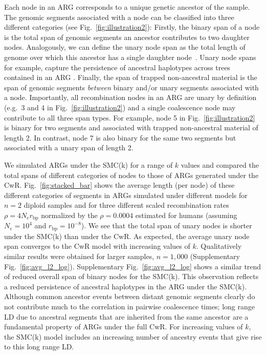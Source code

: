 \documentclass[9pt,twocolumn,twoside,lineno]{gsajnl}
\begin{document}
Each node in an ARG corresponds to a unique genetic ancestor of the sample. The genomic segments associated with a node can be classified into three different categories (see Fig.~\ref{fig:illustration2}): Firstly, the binary span of a node is the total span of genomic segments an ancestor contributes to two daughter nodes. Analogously, we can define the unary node span as the total length of genome over which this ancestor has a single daughter node~\cite{wong_general_2024}. Unary node spans  for example, capture the persistence of ancestral haplotypes across trees contained in an ARG \citep{Fritze_forest_2025}. Finally, the span of trapped non-ancestral material is the span of genomic segments \textit{between} binary and/or unary segments associated with a node. Importantly, all recombination nodes in an ARG are unary by definition (e.g.\ 3 and 4 in Fig.~\ref{fig:illustration2}) and a single coalescence node may contribute to all three span types. For example, node 5 in Fig.~\ref{fig:illustration2} is binary for two segments and associated with trapped non-ancestral material of length 2. In contrast, node 7 is also binary for the same two segments but associated with a unary span of length 2. 

We simulated ARGs under the SMC(k) for a range of $k$ values and compared the total spans of different categories of nodes to those of ARGs generated under the CwR. Fig.~\ref{fig:stacked_bar} shows the average length (per node) of these different categories of segments in ARGs simulated under different models for $n=2$ diploid samples and for three different scaled recombination rates $\rho = 4 N_e r_\mathrm{bp}$ normalized by the $\rho = 0.0004$ estimated for humans (assuming $N_e =10^4$ and $r_\mathrm{bp}= 10^{-8}$). We see that the total span of unary nodes is shorter under the SMC(k) than under the CwR. As expected, the average unary node span converges to the CwR model with increasing values of $k$. Qualitatively similar results were obtained for larger samples, $n=1,000$ (Supplementary Fig.~\ref{fig:avg_l2_log}). Supplementary Fig.~\ref{fig:avg_l2_log} shows a similar trend of reduced overall span of binary nodes for the SMC(k). This observation reflects a reduced persistence of ancestral haplotypes in the ARG under the SMC(k). Although common ancestor events between distant genomic segments clearly do not contribute much to the correlation in pairwise coalescence times; long range LD due to ancestral segments that are inherited from the same ancestor are a fundamental property of ARGs under the full CwR. For increasing values of $k$, the SMC(k) model includes an increasing number of ancestry events that give rise to this long range LD.
\end{document}
